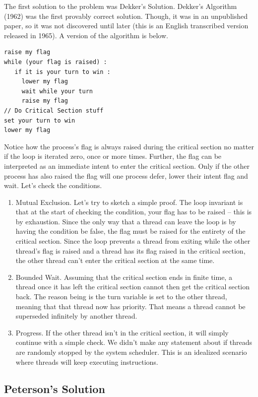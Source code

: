 The first solution to the problem was Dekker's Solution.
Dekker's Algorithm (1962) was the first provably correct solution.
Though, it was in an unpublished paper, so it was not discovered until later \cite{dekker_dijkstra_1965} (this is an English transcribed version released in 1965).
A version of the algorithm is below.

\begin{lstlisting}
raise my flag
while (your flag is raised) :
   if it is your turn to win :
     lower my flag
     wait while your turn
     raise my flag
// Do Critical Section stuff
set your turn to win
lower my flag
\end{lstlisting}

Notice how the process's flag is always raised during the critical section no matter if the loop is iterated zero, once or more times.
Further, the flag can be interpreted as an immediate intent to enter the critical section.
Only if the other process has also raised the flag will one process defer, lower their intent flag and wait.
Let's check the conditions.

\begin{enumerate}
\item Mutual Exclusion. Let's try to sketch a simple proof.
  The loop invariant is that at the start of checking the condition, your flag has to be raised -- this is by exhaustion.
  Since the only way that a thread can leave the loop is by having the condition be false, the flag must be raised for the entirety of the critical section.
  Since the loop prevents a thread from exiting while the other thread's flag is raised and a thread has its flag raised in the critical section, the other thread can't enter the critical section at the same time.
\item Bounded Wait.
  Assuming that the critical section ends in finite time, a thread once it has left the critical section cannot then get the critical section back.
  The reason being is the turn variable is set to the other thread, meaning that that thread now has priority.
  That means a thread cannot be superseded infinitely by another thread.
\item Progress.  If the other thread isn't in the critical section, it will simply continue with a simple check. We didn't make any statement about if threads are randomly stopped by the system scheduler.
  This is an idealized scenario where threads will keep executing instructions.
\end{enumerate}

\subsection{Peterson's Solution}

